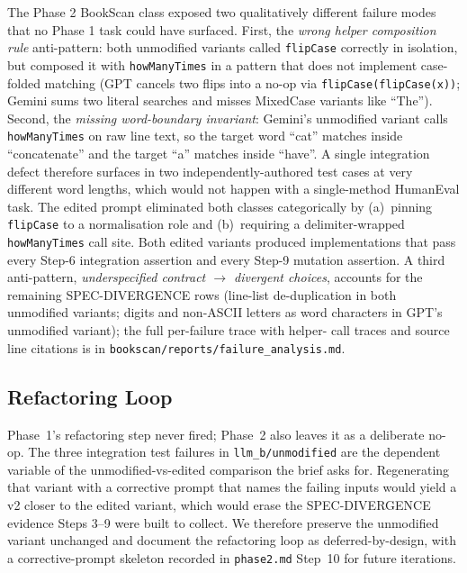 \documentclass[journal]{IEEEtran}
\begin{document}
The Phase 2 BookScan class exposed two qualitatively different
failure modes that no Phase 1 task could have surfaced. First,
the \emph{wrong helper composition rule} anti-pattern: both
unmodified variants called \texttt{flipCase} correctly in
isolation, but composed it with \texttt{howManyTimes} in a
pattern that does not implement case-folded matching (GPT
cancels two flips into a no-op via
\texttt{flipCase(flipCase(x))}; Gemini sums two literal
searches and misses MixedCase variants like ``The''). Second,
the \emph{missing word-boundary invariant}: Gemini's unmodified
variant calls \texttt{howManyTimes} on raw line text, so the
target word ``cat'' matches inside ``concatenate'' and the
target ``a'' matches inside ``have''. A single integration
defect therefore surfaces in two independently-authored test
cases at very different word lengths, which would not happen
with a single-method HumanEval task. The edited prompt
eliminated both classes categorically by (a)~pinning
\texttt{flipCase} to a normalisation role and (b)~requiring a
delimiter-wrapped \texttt{howManyTimes} call site. Both edited
variants produced implementations that pass every Step-6
integration assertion and every Step-9 mutation assertion. A
third anti-pattern, \emph{underspecified contract $\rightarrow$
divergent choices}, accounts for the remaining SPEC-DIVERGENCE
rows (line-list de-duplication in both unmodified variants;
digits and non-ASCII letters as word characters in GPT's
unmodified variant); the full per-failure trace with helper-
call traces and source line citations is in
\texttt{bookscan/reports/failure\_analysis.md}.

\subsection{Refactoring Loop}
\label{sec:p2refactor}

Phase~1's refactoring step never fired; Phase~2 also leaves it
as a deliberate no-op. The three integration test failures in
\texttt{llm\_b/unmodified} are the dependent variable of the
unmodified-vs-edited comparison the brief asks for.
Regenerating that variant with a corrective prompt that names
the failing inputs would yield a v2 closer to the edited
variant, which would erase the SPEC-DIVERGENCE evidence Steps
3--9 were built to collect. We therefore preserve the
unmodified variant unchanged and document the refactoring loop
as deferred-by-design, with a corrective-prompt skeleton
recorded in \texttt{phase2.md} Step~10 for future iterations.
\end{document}
